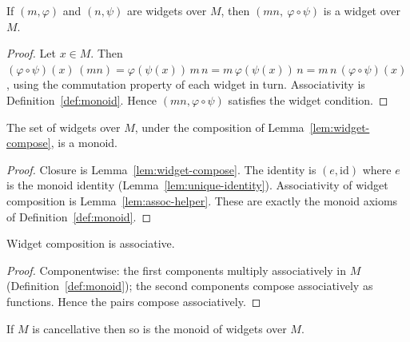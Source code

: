 \begin{lemma}
  \label{lem:widget-compose}
  If $(m,\varphi)$ and $(n,\psi)$ are widgets over $M$, then
  $(mn,\ \varphi\circ\psi)$ is a widget over $M$.
\end{lemma}
\begin{proof}
  Let $x \in M$. Then
  $(\varphi\circ\psi)(x)\,(mn) = \varphi(\psi(x))\,m\,n
   = m\,\varphi(\psi(x))\,n = m\,n\,(\varphi\circ\psi)(x)$,
  using the commutation property of each widget in turn. Associativity is
  Definition~\ref{def:monoid}. Hence $(mn, \varphi\circ\psi)$ satisfies the
  widget condition.   %
\end{proof}

\begin{theorem}
  \label{thm:widget-monoid}
  The set of widgets over $M$, under the composition of
  Lemma~\ref{lem:widget-compose}, is a monoid.
\end{theorem}
\begin{proof}
  Closure is Lemma~\ref{lem:widget-compose}. The identity is
  $(e, \mathrm{id})$ where $e$ is the monoid identity
  (Lemma~\ref{lem:unique-identity}). Associativity of widget composition is
  Lemma~\ref{lem:assoc-helper}. These are exactly the monoid axioms of
  Definition~\ref{def:monoid}.
\end{proof}

\begin{lemma}
  \label{lem:assoc-helper}
  Widget composition is associative.
\end{lemma}
\begin{proof}
  Componentwise: the first components multiply associatively in $M$
  (Definition~\ref{def:monoid}); the second components compose associatively
  as functions. Hence the pairs compose associatively.
\end{proof}

\begin{proposition}
  \label{prop:widget-cancel}
  \notready
  If $M$ is cancellative then so is the monoid of widgets over $M$.
\end{proposition}

